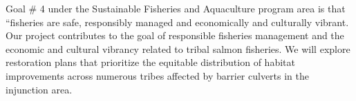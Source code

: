 \documentclass[12pt]{elsarticle}
\begin{document}
Goal \# 4 under the Sustainable Fisheries and Aquaculture program area is that ``fisheries are safe, responsibly managed and economically and culturally vibrant. Our project contributes to the goal of responsible fisheries management and the economic and cultural vibrancy related to tribal salmon fisheries. We will explore restoration plans that prioritize the equitable distribution of habitat improvements across numerous tribes affected by barrier culverts in the injunction area. 





\clearpage

\end{document}

